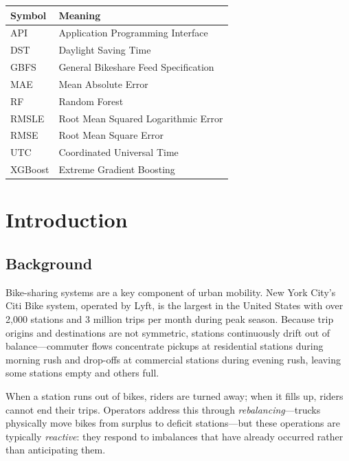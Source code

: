 \documentclass[12pt,a4paper]{report}
\begin{document}
\noindent\begin{tabular}{@{}p{1.2in}p{3.5in}@{}}
\toprule
\textbf{Symbol} & \textbf{Meaning} \\
\midrule
API & Application Programming Interface \\
DST & Daylight Saving Time \\
GBFS & General Bikeshare Feed Specification \\
MAE & Mean Absolute Error \\
RF & Random Forest \\
RMSLE & Root Mean Squared Logarithmic Error \\
RMSE & Root Mean Square Error \\
UTC & Coordinated Universal Time \\
XGBoost & Extreme Gradient Boosting \\
\bottomrule
\end{tabular}
\clearpage

\setcounter{page}{1}

\chapter{Introduction}

\section{Background}

Bike-sharing systems are a key component of urban mobility. New
York City's Citi Bike system, operated by Lyft, is the largest in
the United States with over 2{,}000 stations and 3 million trips per
month during peak season. Because trip origins and destinations are
not symmetric, stations continuously drift out of balance---commuter
flows concentrate pickups at residential stations during morning
rush and drop-offs at commercial stations during evening rush,
leaving some stations empty and others full.

When a station runs out of bikes, riders are turned away; when it
fills up, riders cannot end their trips. Operators address this
through \emph{rebalancing}---trucks physically move bikes from
surplus to deficit stations---but these operations are typically
\emph{reactive}: they respond to imbalances that have already
occurred rather than anticipating them.
\end{document}
